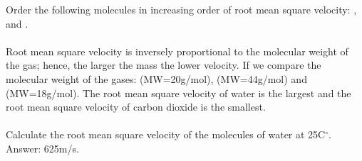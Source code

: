 \documentclass[main.tex]{subfiles}
\begin{document}
\begin{description}
\begin{example} %
Order the following molecules in increasing order of root mean square velocity: ,  and .\\
\\
Root mean square velocity is inversely proportional to the molecular weight of the gas; hence, the larger the mass the lower velocity. If we compare the molecular weight of the gases: (MW=20g/mol), (MW=44g/mol) and (MW=18g/mol). The root mean square velocity of water is the largest and the root mean square velocity of carbon dioxide is the smallest.
\\
\faDiamond\ \\
Calculate the root mean square velocity of the molecules of water at 25C$^{\circ}$.\\
\flushright Answer: 625m/s.
\end{example}%






\end{description}
\end{document}
